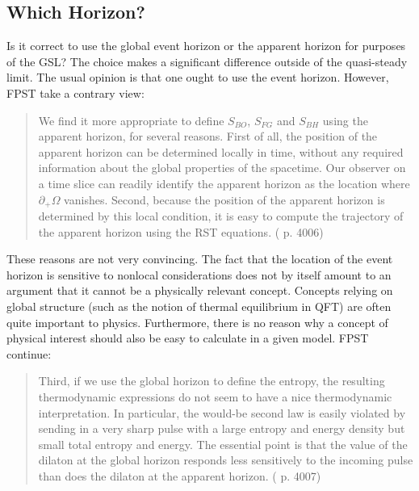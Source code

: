 \documentclass{article}
\begin{document}
\subsection{Which Horizon?}\label{horizon}

Is it correct to use the global event horizon or the apparent horizon for purposes of the GSL?  The choice makes a significant difference outside of the quasi-steady limit.  The usual opinion is that one ought to use the event horizon.  However, FPST take a contrary view:
\begin{quote}\small
We find it more appropriate to define $S_{BO}$, $S_{FG}$ and $S_{BH}$ using the apparent horizon, for several reasons.  First of all, the position of the apparent horizon can be determined locally in time, without any required information about the global properties of the spacetime.  Our observer on a time slice can readily identify the apparent horizon as the location where $\partial_{+} \Omega$ vanishes.  Second, because the position of the apparent horizon is determined by this local condition, it is easy to compute the trajectory of the apparent horizon using the RST equations.  (\cite{fiola94} p. 4006)
\end{quote}
These reasons are not very convincing.  The fact that the location of the event horizon is sensitive to nonlocal considerations does not by itself amount to an argument that it cannot be a physically relevant concept.  Concepts relying on global structure (such as the notion of thermal equilibrium in QFT) are often quite important to physics.  Furthermore, there is no reason why a concept of physical interest should also be easy to calculate in a given model.  FPST continue:
\begin{quote}\small
Third, if we use the global horizon to define the entropy, the resulting thermodynamic expressions do not seem to have a nice thermodynamic interpretation.  In particular, the would-be second law is easily violated by sending in a very sharp pulse with a large entropy and energy density but small total entropy and energy.  The essential point is that the value of the dilaton at the global horizon responds less sensitively to the incoming pulse than does the dilaton at the apparent horizon.  (\cite{fiola94} p. 4007)
\end{quote}
\end{document}
